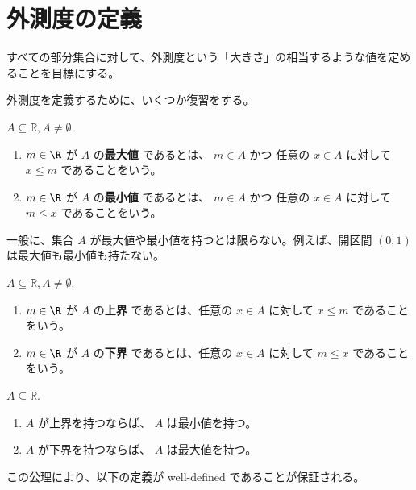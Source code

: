 \documentclass[article,paper=a4paper]{jlreq}
\begin{document}
\section{外測度の定義}

すべての部分集合に対して、外測度という「大きさ」の相当するような値を定めることを目標にする。

外測度を定義するために、いくつか復習をする。

\begin{dfn}
    \quad $A \subseteq \mathbb{R}, A \neq \emptyset$.
    \begin{enumerate}[label=(\roman*)\,,ref=(\roman*)]
        \item $m \in \R$ が $A$ の\textbf{最大値} であるとは、 $m \in A$ かつ 任意の $x \in A$ に対して $x \leq m$ であることをいう。
        \item $m \in \R$ が $A$ の\textbf{最小値} であるとは、 $m \in A$ かつ 任意の $x \in A$ に対して $m \leq x$ であることをいう。
    \end{enumerate}
\end{dfn}

\begin{rem}
    一般に、集合 $A$ が最大値や最小値を持つとは限らない。例えば、開区間 $(0,1)$ は最大値も最小値も持たない。
\end{rem}

\begin{dfn}
    \quad $A \subseteq \mathbb{R}, A \neq \emptyset$.
    \begin{enumerate}[label=(\roman*)\,,ref=(\roman*)]
        \item $m \in \R$ が $A$ の\textbf{上界} であるとは、任意の $x \in A$ に対して $x \leq m$ であることをいう。
        \item $m \in \R$ が $A$ の\textbf{下界} であるとは、任意の $x \in A$ に対して $m \leq x$ であることをいう。
    \end{enumerate}
\end{dfn}

\begin{axiom}
    \quad $A \subseteq \mathbb{R}$.
    \begin{enumerate}[label=(\roman*)\,,ref=(\roman*)]
        \item $A$ が上界を持つならば、 $A$ は最小値を持つ。
        \item $A$ が下界を持つならば、 $A$ は最大値を持つ。
    \end{enumerate}
\end{axiom}

この公理により、以下の定義が well-defined であることが保証される。
\end{document}
